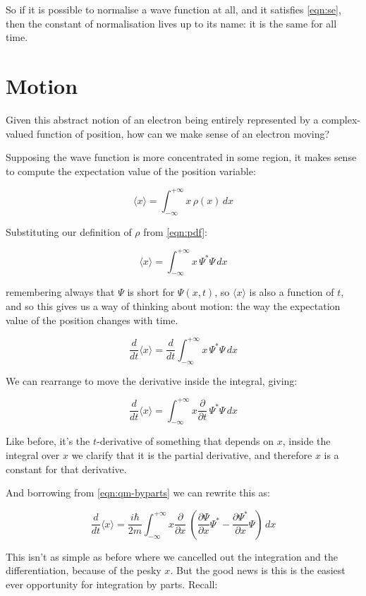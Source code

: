 So if it is possible to normalise a wave function at all, and it satisfies \eqref{eqn:se}, then the constant of normalisation lives up to its name: it is the same for all time.

\section{Motion}

Given this abstract notion of an electron being entirely represented by a complex-valued function of position, how can we make sense of an electron moving?

Supposing the wave function is more concentrated in some region, it makes sense to compute the expectation value of the position variable:

$$
\langle x \rangle =
\int_{-\infty}^{+\infty}
x \, \rho(x)
\,dx
$$

Substituting our definition of $\rho$ from \eqref{eqn:pdf}:

$$
\langle x \rangle =
\int_{-\infty}^{+\infty}
x \, \Psi^*\Psi
\,dx
$$

remembering always that $\Psi$ is short for $\Psi(x, t)$, so $\langle x \rangle$ is also a function of $t$, and so this gives us a way of thinking about motion: the way the expectation value of the position changes with time.

$$
\frac{d}{dt} \langle x \rangle =
\frac{d}{dt}
\int_{-\infty}^{+\infty}
x \, \Psi^*\Psi
\,dx
$$

We can rearrange to move the derivative inside the integral, giving:

$$
\frac{d}{dt} \langle x \rangle =
\int_{-\infty}^{+\infty}
x \frac{\partial}{\partial t}
\, \Psi^*\Psi
\,dx
$$

Like before, it's the $t$-derivative of something that depends on $x$, inside the integral over $x$ we clarify that it is the partial derivative, and therefore $x$ is a constant for that derivative.

And borrowing from \eqref{eqn:qm-byparts} we can rewrite this as:

$$
\frac{d}{dt} \langle x \rangle =
\frac{i \hbar}{2m}
\int_{-\infty}^{+\infty}
x
\frac{\partial}{\partial x} \
\left(
\frac{\partial \Psi}{\partial x}\Psi^*
- \frac{\partial \Psi^*}{\partial x}\Psi
\right)
\,dx
$$

This isn't as simple as before where we cancelled out the integration and the differentiation, because of the pesky $x$. But the good news is this is the easiest ever opportunity for integration by parts. Recall:

